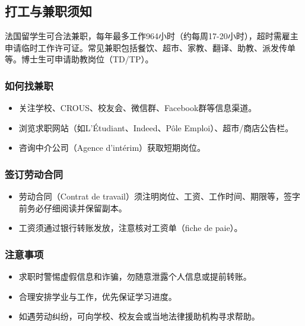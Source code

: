\subsection{打工与兼职须知}

法国留学生可合法兼职，每年最多工作964小时（约每周17-20小时），超时需雇主申请临时工作许可证。常见兼职包括餐饮、超市、家教、翻译、助教、派发传单等。博士生可申请助教岗位（TD/TP）。

\subsubsection{如何找兼职}
\begin{itemize}
    \item 关注学校、CROUS、校友会、微信群、Facebook群等信息渠道。
    \item 浏览求职网站（如L'Étudiant、Indeed、Pôle Emploi）、超市/商店公告栏。
    \item 咨询中介公司（Agence d’intérim）获取短期岗位。
\end{itemize}

\subsubsection{签订劳动合同}
\begin{itemize}
    \item 劳动合同（Contrat de travail）须注明岗位、工资、工作时间、期限等，签字前务必仔细阅读并保留副本。
    \item 工资须通过银行转账发放，注意核对工资单（fiche de paie）。
\end{itemize}

\subsubsection{注意事项}
\begin{itemize}
    \item 求职时警惕虚假信息和诈骗，勿随意泄露个人信息或提前转账。
    \item 合理安排学业与工作，优先保证学习进度。
    \item 如遇劳动纠纷，可向学校、校友会或当地法律援助机构寻求帮助。
\end{itemize}
